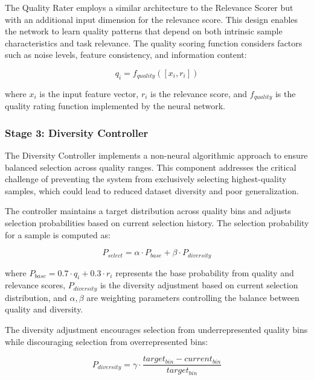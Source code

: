 \documentclass[12pt]{article}
\begin{document}
The Quality Rater employs a similar architecture to the Relevance Scorer but with an additional input dimension for the relevance score. This design enables the network to learn quality patterns that depend on both intrinsic sample characteristics and task relevance. The quality scoring function considers factors such as noise levels, feature consistency, and information content:

\begin{equation}
q_i = f_{quality}([x_i, r_i])
\end{equation}

where $x_i$ is the input feature vector, $r_i$ is the relevance score, and $f_{quality}$ is the quality rating function implemented by the neural network.

\subsubsection{Stage 3: Diversity Controller}\label{diversity-controller}

The Diversity Controller implements a non-neural algorithmic approach to ensure balanced selection across quality ranges. This component addresses the critical challenge of preventing the system from exclusively selecting highest-quality samples, which could lead to reduced dataset diversity and poor generalization.

The controller maintains a target distribution across quality bins and adjusts selection probabilities based on current selection history. The selection probability for a sample is computed as:

\begin{equation}
P_{select} = \alpha \cdot P_{base} + \beta \cdot P_{diversity}
\end{equation}

where $P_{base} = 0.7 \cdot q_i + 0.3 \cdot r_i$ represents the base probability from quality and relevance scores, $P_{diversity}$ is the diversity adjustment based on current selection distribution, and $\alpha, \beta$ are weighting parameters controlling the balance between quality and diversity.

The diversity adjustment encourages selection from underrepresented quality bins while discouraging selection from overrepresented bins:

\begin{equation}
P_{diversity} = \gamma \cdot \frac{target_{bin} - current_{bin}}{target_{bin}}
\end{equation}
\end{document}

